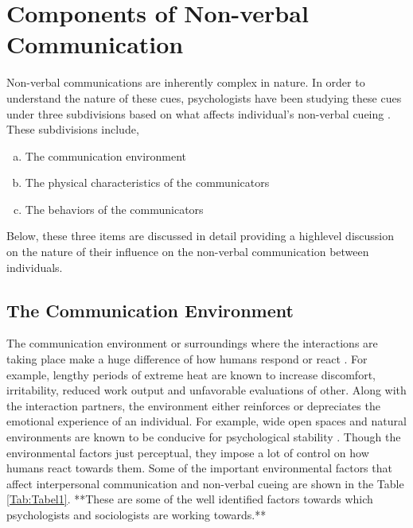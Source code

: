 \documentclass[oneside,11pt]{memoir}
\begin{document}
\section{Components of Non-verbal Communication}
Non-verbal communications are inherently complex in nature. In order to understand the nature of these cues, psychologists have been studying these cues under three subdivisions based on what affects individual’s non-verbal cueing \cite{knapp_nonverbal_1996}. These subdivisions include,
\begin{enumerate}[(a)]
\item The communication environment
\item  The physical characteristics of the communicators
\item The behaviors of the communicators
\end{enumerate}
Below, these three items are discussed in detail providing a highlevel discussion on the nature of their influence on the non-verbal communication between individuals.

\subsection{The Communication Environment}
The communication environment or surroundings where the interactions are taking place make a huge difference of how humans respond or react \cite{hargie_social_1994} \cite{walsh_person-environment_2000}. For example, lengthy periods of extreme heat \cite{kenrick_ambient_1986} are known to increase discomfort, irritability, reduced work output and unfavorable evaluations of other. Along with the interaction partners, the environment either reinforces or depreciates the emotional experience of an individual. For example, wide open spaces and natural environments are known to be conducive for psychological stability \cite{krupat_people_1985}. Though the environmental factors just perceptual, they impose a lot of control on how humans react towards them. Some of the important environmental factors that affect interpersonal communication and non-verbal cueing are shown in the Table \ref{Tab:Tabel1}. **These are some of the well identified factors towards which psychologists and sociologists are working towards.**
\end{document}
